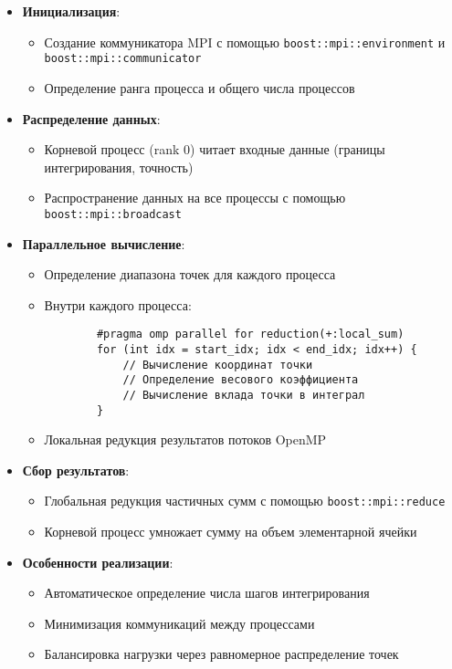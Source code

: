 \documentclass[a4paper,12pt]{article}
\begin{document}
\begin{itemize}
    \item \textbf{Инициализация}: 
    \begin{itemize}
        \item Создание коммуникатора MPI с помощью \texttt{boost::mpi::environment} и \texttt{boost::mpi::communicator}
        \item Определение ранга процесса и общего числа процессов
    \end{itemize}
    
    \item \textbf{Распределение данных}:
    \begin{itemize}
        \item Корневой процесс (rank 0) читает входные данные (границы интегрирования, точность)
        \item Распространение данных на все процессы с помощью \texttt{boost::mpi::broadcast}
    \end{itemize}
    
    \item \textbf{Параллельное вычисление}:
    \begin{itemize}
        \item Определение диапазона точек для каждого процесса
        \item Внутри каждого процесса:
        \begin{verbatim}
        #pragma omp parallel for reduction(+:local_sum)
        for (int idx = start_idx; idx < end_idx; idx++) {
            // Вычисление координат точки
            // Определение весового коэффициента
            // Вычисление вклада точки в интеграл
        }
        \end{verbatim}
        \item Локальная редукция результатов потоков OpenMP
    \end{itemize}
    
    \item \textbf{Сбор результатов}:
    \begin{itemize}
        \item Глобальная редукция частичных сумм с помощью \texttt{boost::mpi::reduce}
        \item Корневой процесс умножает сумму на объем элементарной ячейки
    \end{itemize}
    
    \item \textbf{Особенности реализации}:
    \begin{itemize}
        \item Автоматическое определение числа шагов интегрирования
        \item Минимизация коммуникаций между процессами
        \item Балансировка нагрузки через равномерное распределение точек
    \end{itemize}
\end{itemize}
\end{document}
